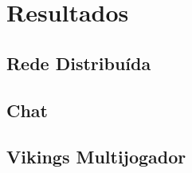 \chapter{Resultados}
\label{sec:resultados}

\section{Rede Distribuída}
\label{sec:resultados:rede}

\section{Chat}
\label{sec:resultados:chat}

\section{Vikings Multijogador}
\label{sec:resultados:vikings}
